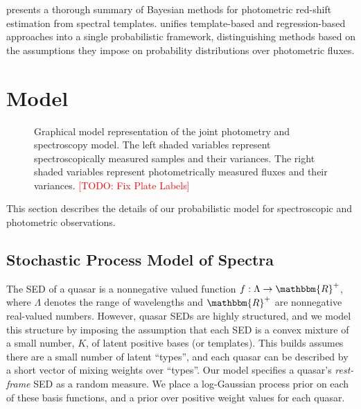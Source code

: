 \documentclass{article}
\newcommand{\R}{\mathbbm{R}}
\newcommand{\red}[1]{\textcolor{red}{[TODO: #1]}}
\begin{document}
\citet{benitez2000bayesian} presents a thorough summary of Bayesian methods for photometric red-shift estimation from spectral templates.  
\citet{budavari2009unified} unifies template-based and regression-based
approaches into a single probabilistic framework, distinguishing methods based on the assumptions they impose on probability distributions over photometric fluxes. 



\section{Model}

\begin{figure}

\caption{Graphical model representation of the joint photometry and spectroscopy model.  The left shaded variables represent spectroscopically measured samples and their variances.  The right shaded variables represent photometrically measured fluxes and their variances. \red{Fix Plate Labels} }
\end{figure}


\label{sec:model}
This section describes the details of our probabilistic model for spectroscopic and photometric observations.  

\subsection{Stochastic Process Model of Spectra}
The SED of a quasar is a nonnegative valued function $f : \Lambda \rightarrow \R^+$, where $\Lambda$ denotes the range of wavelengths and $\R^+$ are nonnegative real-valued numbers.  However, quasar SEDs are highly structured, and we model this structure by imposing the assumption that each SED is a convex mixture of a small number, $K$, of latent positive bases (or templates).  
This builds assumes there are a small number of latent ``types'', and each quasar can be described by a short vector of mixing weights over ``types''. 
Our model specifies a quasar's \emph{rest-frame} SED as a random measure. 
We place a log-Gaussian process prior on each of these basis functions, and a prior over positive weight values for each quasar.  
\end{document}

